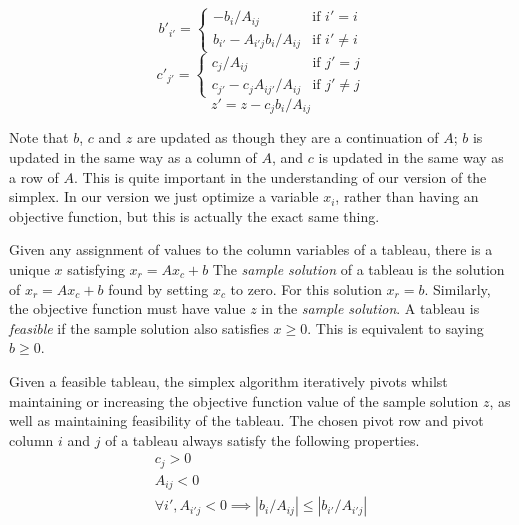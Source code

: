 \documentclass[11pt]{article} %
\begin{document}
\begin{equation}\label{eqn:pivot_const}
  b'_{i'} = \begin{cases}
    -b_i/A_{ij} & \text{if } i' = i \\
    b_{i'} - A_{i'j}b_i/A_{ij} & \text{if } i' \ne i
  \end{cases}
\end{equation}
\begin{equation}
  c'_{j'} = \begin{cases}
    c_j/A_{ij} & \text{if } j' = j \\
    c_{j'} - c_jA_{ij'}/A_{ij} & \text{if } j' \ne j
  \end{cases}
\end{equation}
\begin{equation}\label{eqn:pivot_obj}
  z' = z - c_jb_i/A_{ij}
\end{equation}

Note that $b$, $c$ and $z$ are updated as though they are a continuation of $A$; $b$ is updated in the same way as a column of $A$, and $c$ is updated in the same way as a row of $A$. \color{red} This is quite important in the understanding of our version of the simplex. In our version we just optimize a variable $x_i$, rather than having an objective function, but this is actually the exact same thing.\color{black}

Given any assignment of values to the column variables of a tableau, there is a unique $x$ satisfying $x_r=Ax_c+b$ The \textit{sample solution} of a tableau is the solution of $x_r = Ax_c+b$ found by setting $x_c$ to zero. For this solution $x_r=b$. Similarly, the objective function must have value $z$ in the \textit{sample solution}. A tableau is \textit{feasible} if the sample solution also satisfies $x \ge 0$. This is equivalent to saying $b \ge 0$.

Given a feasible tableau, the simplex algorithm iteratively pivots whilst maintaining or increasing the objective function value of the sample solution $z$, as well as maintaining feasibility of the tableau. The chosen pivot row and pivot column $i$ and $j$ of a tableau always satisfy the following properties.
\begin{equation}\label{eqn:valid_pivot}
  \begin{aligned}
    c_j > 0 \\
    A_{ij} < 0 \\
    \forall i', A_{i'j} < 0 \implies \left|b_i/A_{ij}\right| \le \left|b_{i'} / A_{i'j}\right|
  \end{aligned}
\end{equation}
\end{document}
